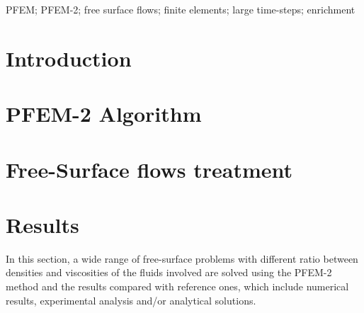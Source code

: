 \documentclass[review]{elsarticle}
\begin{document}
\begin{frontmatter}
\begin{keyword}
PFEM; PFEM-2; free surface flows; finite elements; large time-steps; enrichment
\end{keyword}

\end{frontmatter}

\linenumbers
\fboxsep=0mm%

\section{Introduction}\label{Intro}



\section{PFEM-2 Algorithm}\label{PFEM_Algorithm}


\section[Free-Surface treatment]{Free-Surface flows treatment}\label{Free_surface}



% 

\section{Results}\label{FS_results}

In this section, a wide range of free-surface problems with different ratio between densities and viscosities of the fluids involved are solved using the PFEM-2 method and the results compared with reference ones, which include numerical results, experimental analysis and/or analytical solutions.
\end{document}
